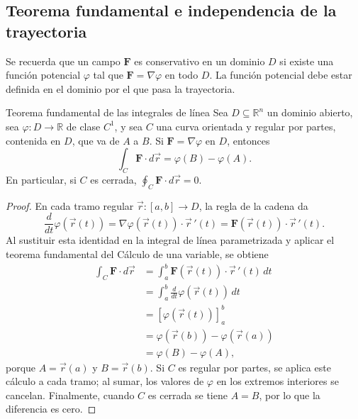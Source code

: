 \subsection{Teorema fundamental e independencia de la trayectoria}

Se recuerda que un campo $\mathbf{F}$ es conservativo en un dominio $D$ si existe una función potencial $\varphi$ tal que $\mathbf{F}=\nabla\varphi$ en todo $D$. La función potencial debe estar definida en el dominio por el que pasa la trayectoria.

\begin{mytheorem}{Teorema fundamental de las integrales de línea}
Sea $D\subseteq\mathbb R^n$ un dominio abierto, sea $\varphi:D\to\mathbb R$ de clase $C^1$, y sea $C$ una curva orientada y regular por partes, contenida en $D$, que va de $A$ a $B$. Si $\mathbf{F}=\nabla\varphi$ en $D$, entonces
\[
\int_C\mathbf{F}\cdot d\vec r=\varphi(B)-\varphi(A).
\]
En particular, si $C$ es cerrada, $\displaystyle\oint_C\mathbf{F}\cdot d\vec r=0$.
\end{mytheorem}

\begin{proof}
En cada tramo regular $\vec r:[a,b]\to D$, la regla de la cadena da
\[
\frac{d}{dt}\varphi(\vec r(t))
=\nabla\varphi(\vec r(t))\cdot\vec r\,'(t)
=\mathbf{F}(\vec r(t))\cdot\vec r\,'(t).
\]
Al sustituir esta identidad en la integral de línea parametrizada y aplicar el teorema fundamental del Cálculo de una variable, se obtiene
\begin{align*}
\int_C\mathbf{F}\cdot d\vec r
&=\int_a^b\mathbf{F}(\vec r(t))\cdot\vec r\,'(t)\,dt\\
&=\int_a^b\frac{d}{dt}\varphi(\vec r(t))\,dt\\
&=\left[\varphi(\vec r(t))\right]_a^b\\
&=\varphi(\vec r(b))-\varphi(\vec r(a))\\
&=\varphi(B)-\varphi(A),
\end{align*}
porque $A=\vec r(a)$ y $B=\vec r(b)$. Si $C$ es regular por partes, se aplica este cálculo a cada tramo; al sumar, los valores de $\varphi$ en los extremos interiores se cancelan. Finalmente, cuando $C$ es cerrada se tiene $A=B$, por lo que la diferencia es cero.
\end{proof}

